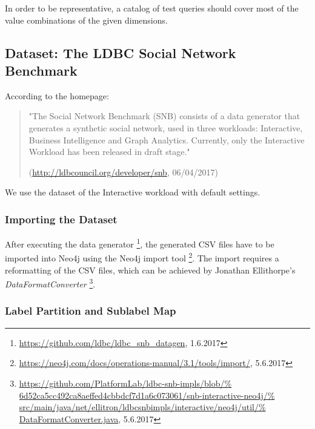 In order to be representative, a catalog of test queries should cover most of
the value combinations of the given dimensions.

\subsection{Dataset: The LDBC Social Network Benchmark}

According to the homepage:
\begin{quote}
"The Social Network Benchmark (SNB) consists of a data generator that generates
a synthetic social network, used in three workloads: Interactive, Business
Intelligence and Graph Analytics. Currently, only the Interactive Workload has
been released in draft stage."

(\url{http://ldbcouncil.org/developer/snb}, 06/04/2017)
\end{quote}

We use the dataset of the Interactive workload
\cite{erling_ldbc_2015} with default settings.

\subsubsection{Importing the Dataset}

After executing the data generator%
\footnote{\url{https://github.com/ldbc/ldbc_snb_datagen}, 1.6.2017}, the
generated CSV files have to be imported into Neo4j using the Neo4j import
tool%
\footnote{\url{https://neo4j.com/docs/operations-manual/3.1/tools/import/},
5.6.2017}.
The import requires a reformatting of the CSV files, which can be achieved by
Jonathan Ellithorpe's \emph{DataFormatConverter}%
\footnote{\url{https://github.com/PlatformLab/ldbc-snb-impls/blob/%
6d52ca5cc492ca8aeffed4cbbdcf7d1a6c073061/snb-interactive-neo4j/%
src/main/java/net/ellitron/ldbcsnbimpls/interactive/neo4j/util/%
DataFormatConverter.java}, 5.6.2017}.

\subsubsection{Label Partition and Sublabel Map}

